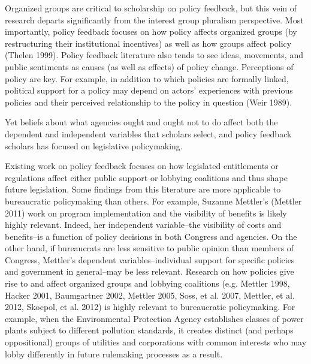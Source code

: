 Organized groups are critical to scholarship on policy feedback, but this vein of research departs significantly from the interest group pluralism perspective. Most importantly, policy feedback focuses on how policy affects organized groups (by restructuring their institutional incentives) as well as how groups affect policy (Thelen 1999). Policy feedback literature also tends to see ideas, movements, and public sentiments as causes (as well as effects) of policy change. Perceptions of policy are key. For example, in addition to which policies are formally linked, political support for a policy may depend on actors' experiences with previous policies and their perceived relationship to the policy in question (Weir 1989). 



Yet beliefs about what agencies ought and ought not to do affect both the dependent and independent variables that scholars select, and policy feedback scholars has focused on legislative policymaking. %

Existing work on policy feedback focuses on how legislated entitlements or regulations affect either public support or lobbying coalitions and thus shape future legislation. Some findings from this literature are more applicable to bureaucratic policymaking than others. For example, Suzanne Mettler's (Mettler 2011) work on program implementation and the visibility of benefits is likely highly relevant. Indeed, her independent variable--the visibility of costs and benefits--is a function of policy decisions in both Congress and agencies. On the other hand, if bureaucrats are less sensitive to public opinion than members of Congress, Mettler's dependent variables--individual support for specific policies and government in general--may be less relevant. Research on how policies give rise to and affect organized groups and lobbying coalitions (e.g. Mettler 1998, Hacker 2001, Baumgartner 2002, Mettler 2005, Soss, et al. 2007, Mettler, et al. 2012, Skocpol, et al. 2012) is highly relevant to bureaucratic policymaking. For example, when the Environmental Protection Agency establishes classes of power plants subject to different pollution standards, it creates distinct (and perhaps oppositional) groups of utilities and corporations with common interests who may lobby differently in future rulemaking processes as a result. 


